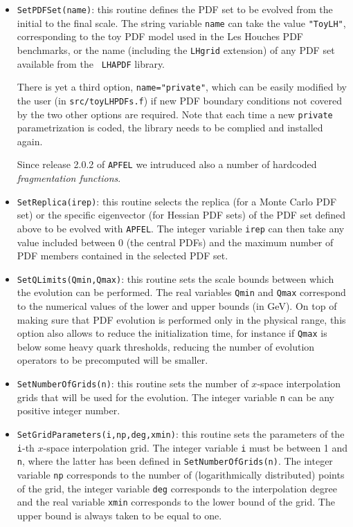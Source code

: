 \documentclass[11pt,a4paper]{article}
\begin{document}
\begin{itemize}
\item {\tt SetPDFSet(name)}: this routine defines the PDF set to be
  evolved from the initial to the final scale. The string variable
  {\tt name} can take the value {\tt "ToyLH"}, corresponding to the toy
  PDF model used in the Les Houches PDF benchmarks, 
or the name (including
  the {\tt LHgrid} extension) of any PDF set available from the {\tt
    LHAPDF} library. 

There is yet a third option, {\tt name="private"},  which can be easily modified by the user (in {\tt src/toyLHPDFs.f}) if
new PDF boundary conditions not covered by the two other options
are required.
%
Note that each time a new {\tt private} parametrization is coded,
the library needs to be complied and installed again.

Since release 2.0.2 of {\tt APFEL} we intruduced also a number of
hardcoded \textit{fragmentation functions}.

\item {\tt SetReplica(irep)}: this routine selects the replica (for a
  Monte Carlo PDF set) or the specific eigenvector  (for Hessian PDF
  sets) of the  PDF set defined above to be evolved with {\tt APFEL}.
%
  The integer variable {\tt irep} can then take any value included
  between 0 (the central PDFs)  and the maximum number of PDF members
  contained in the selected PDF set.

\item {\tt SetQLimits(Qmin,Qmax)}: this routine sets the scale
  bounds between which the evolution can be performed. 
%
The real
  variables {\tt Qmin} and {\tt Qmax} correspond to the numerical
  values of the lower and upper bounds (in GeV).
%
 On top of making sure
  that PDF evolution is performed only in the physical range, this
  option also allows to reduce the initialization time, for instance
  if {\tt Qmax} is below some heavy quark thresholds, reducing the number of
  evolution operators to be precomputed will be smaller.

\item {\tt SetNumberOfGrids(n)}: this routine sets the number of
  $x$-space interpolation grids that will be used for the
  evolution. The integer variable {\tt n} can be any positive integer number.

\item {\tt SetGridParameters(i,np,deg,xmin)}: this routine sets the
  parameters of the {\tt i}-th $x$-space interpolation grid. 
%
The
  integer variable {\tt i} must be between 1 and {\tt n}, where
the latter has been defined in
  {\tt SetNumberOfGrids(n)}.
%
 The integer variable {\tt np} corresponds
  to the number of (logarithmically distributed) points of the grid,
  the integer variable {\tt deg} corresponds to the interpolation
  degree and the real variable {\tt xmin} corresponds to the lower
  bound of the grid. The upper bound is always taken to be equal to
  one.


\end{itemize}
\end{document}
